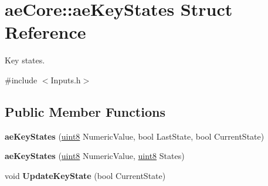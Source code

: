\hypertarget{structae_core_1_1ae_key_states}{}\section{ae\+Core\+:\+:ae\+Key\+States Struct Reference}
\label{structae_core_1_1ae_key_states}


Key states.  




{\ttfamily \#include $<$Inputs.\+h$>$}

\subsection*{Public Member Functions}
\begin{DoxyCompactItemize}
\item 
{\bfseries ae\+Key\+States} (\hyperlink{namespaceae_core_aa13093dc911869e5b24942552898f01f}{uint8} Numeric\+Value, bool Last\+State, bool Current\+State)\hypertarget{structae_core_1_1ae_key_states_a39a9dd6e539c9931eab2e2ca40032aaf}{}\label{structae_core_1_1ae_key_states_a39a9dd6e539c9931eab2e2ca40032aaf}

\item 
{\bfseries ae\+Key\+States} (\hyperlink{namespaceae_core_aa13093dc911869e5b24942552898f01f}{uint8} Numeric\+Value, \hyperlink{namespaceae_core_aa13093dc911869e5b24942552898f01f}{uint8} States)\hypertarget{structae_core_1_1ae_key_states_a7d108dcaa0001e41132dbb779a9d5007}{}\label{structae_core_1_1ae_key_states_a7d108dcaa0001e41132dbb779a9d5007}

\item 
void {\bfseries Update\+Key\+State} (bool Current\+State)\hypertarget{structae_core_1_1ae_key_states_a80fdcd81f529abc94341203922b55c42}{}\label{structae_core_1_1ae_key_states_a80fdcd81f529abc94341203922b55c42}

\end{DoxyCompactItemize}
